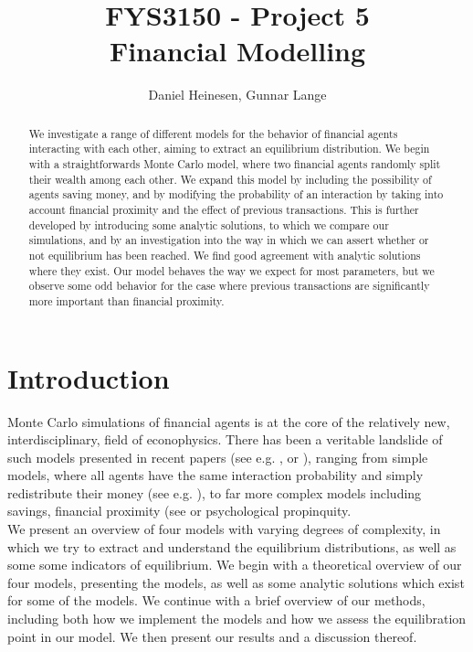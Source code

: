 \documentclass[a4paper, 10pt]{article}
\title{FYS3150 - Project 5\\
Financial Modelling}
\author{Daniel Heinesen, Gunnar Lange}
\begin{document}
\maketitle
\begin{abstract}
We investigate a range of different models for the behavior of financial agents interacting with each other, aiming to extract an equilibrium distribution. We begin with a straightforwards Monte Carlo model, where two financial agents randomly split their wealth among each other. We expand this model by including the possibility of agents saving money, and by modifying the probability of an interaction by taking into account financial proximity and the effect of previous transactions. This is further developed by introducing some analytic solutions, to which we compare our simulations, and by an investigation into the way in which we can assert whether or not equilibrium has been reached. We find good agreement with analytic solutions where they exist. Our model behaves the way we expect for most parameters, but we observe some odd behavior for the case where previous transactions are significantly more important than financial proximity.
\end{abstract}
\tableofcontents
\section{Introduction}
Monte Carlo simulations of financial agents is at the core of the relatively new, interdisciplinary, field of econophysics. There has been a veritable landslide of such models presented in recent papers (see e.g. \cite{Self-adjusted}, \cite{Finite-size} or \cite{AgentBased}), ranging from simple models, where all agents have the same interaction probability and simply redistribute their money (see e.g. \cite{Gibbs}), to far more complex models including savings, financial proximity (see \cite{AgentBased} or psychological propinquity.\\
\linebreak
We present an overview of four models with varying degrees of complexity, in which we try to extract and understand the equilibrium distributions, as well as some some indicators of equilibrium. We begin with a theoretical overview of our four models, presenting the models, as well as some analytic solutions which exist for some of the models. We continue with a brief overview of our methods, including both how we implement the models and how we assess the equilibration point in our model. We then present our results and a discussion thereof.
\end{document}

